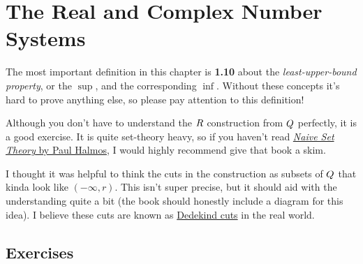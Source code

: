 \chapter{The Real and Complex Number Systems}

The most important definition in this chapter is \textbf{1.10} about the \textit{least-upper-bound property}, or the $\sup$, and the corresponding $\inf$. Without these concepts it's hard to prove anything else, so please pay attention to this definition!

Although you don't have to understand the $R$ construction from $Q$ perfectly, it is a good exercise. It is quite set-theory heavy, so if you haven't read \href{https://amzn.to/3MNZ8e7}{\textit{Naive Set Theory} by Paul Halmos}, I would highly recommend give that book a skim.

I thought it was helpful to think the cuts in the construction as subsets of $Q$ that kinda look like $(-\infty, r)$. This isn't super precise, but it should aid with the understanding quite a bit (the book should honestly include a diagram for this idea).
I believe these cuts are known as \href{https://en.wikipedia.org/wiki/Dedekind_cut}{Dedekind cuts} in the real world.

\section{Exercises}



